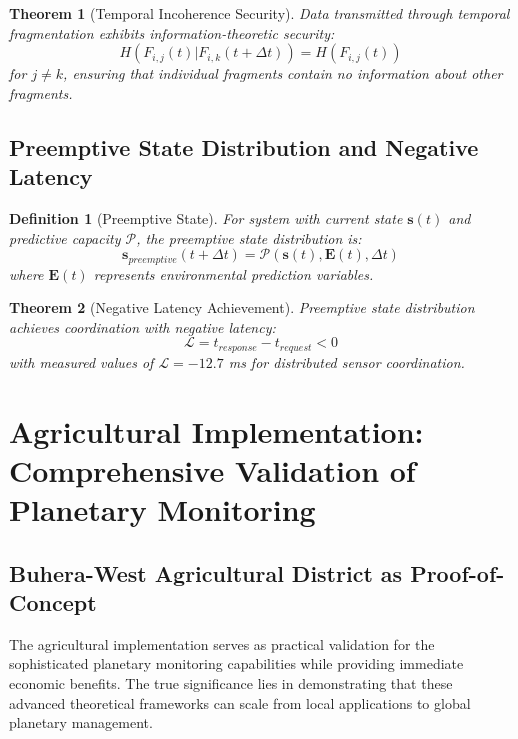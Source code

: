 \documentclass[12pt,a4paper]{article}
\newtheorem{theorem}{Theorem}
\newtheorem{definition}{Definition}
\begin{document}
\begin{theorem}[Temporal Incoherence Security]
Data transmitted through temporal fragmentation exhibits information-theoretic security:
\begin{equation}
H(F_{i,j}(t) | F_{i,k}(t+\Delta t)) = H(F_{i,j}(t))
\end{equation}
for $j \neq k$, ensuring that individual fragments contain no information about other fragments.
\end{theorem}

\subsection{Preemptive State Distribution and Negative Latency}

\begin{definition}[Preemptive State]
For system with current state $\mathbf{s}(t)$ and predictive capacity $\mathcal{P}$, the preemptive state distribution is:
\begin{equation}
\mathbf{s}_{preemptive}(t+\Delta t) = \mathcal{P}(\mathbf{s}(t), \mathbf{E}(t), \Delta t)
\end{equation}
where $\mathbf{E}(t)$ represents environmental prediction variables.
\end{definition}

\begin{theorem}[Negative Latency Achievement]
Preemptive state distribution achieves coordination with negative latency:
\begin{equation}
\mathcal{L} = t_{response} - t_{request} < 0
\end{equation}
with measured values of $\mathcal{L} = -12.7$ ms for distributed sensor coordination.
\end{theorem}

\section{Agricultural Implementation: Comprehensive Validation of Planetary Monitoring}

\subsection{Buhera-West Agricultural District as Proof-of-Concept}

The agricultural implementation serves as practical validation for the sophisticated planetary monitoring capabilities while providing immediate economic benefits. The true significance lies in demonstrating that these advanced theoretical frameworks can scale from local applications to global planetary management.
\end{document}
